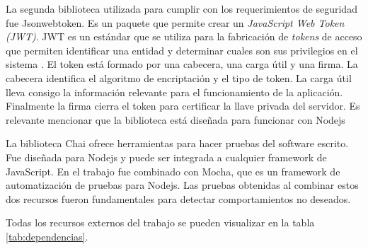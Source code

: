 La segunda biblioteca utilizada para cumplir con los requerimientos de seguridad fue Jsonwebtoken.
Es un paquete que permite crear un \emph{JavaScript Web Token (JWT)}.
JWT es un estándar que se utiliza para la fabricación de \emph{tokens} de acceso que permiten identificar una entidad y determinar cuales son sus privilegios en el sistema \citep{olivera2014jwt}.
El token está formado por una cabecera, una carga útil y una firma.
La cabecera identifica el algoritmo de encriptación y el tipo de token.
La carga útil lleva consigo la información relevante para el funcionamiento de la aplicación.
Finalmente la firma cierra el token para certificar la llave privada del servidor.
Es relevante mencionar que la biblioteca está diseñada para funcionar con Nodejs

La biblioteca Chai ofrece herramientas para hacer pruebas del software escrito.
Fue diseñada para Nodejs y puede ser integrada a cualquier framework de JavaScript.
En el trabajo fue combinado con Mocha, que es un framework de automatización de pruebas para Nodejs.
Las pruebas obtenidas al combinar estos dos recursos fueron fundamentales para detectar comportamientos no deseados.

Todas los recursos externos del trabajo se pueden visualizar en la tabla \ref{tab:dependencias}.

